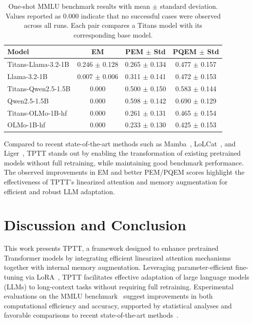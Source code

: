 \documentclass[10pt,a4paper]{article}
\begin{document}
\begin{table}[h!]
    \centering
    \renewcommand{\arraystretch}{1.2}
    \begin{tabular}{|l|c|c|c|}
    \hline
    Model & EM & PEM $\pm$ Std & PQEM $\pm$ Std \\
    \hline
    Titans-Llama-3.2-1B & 0.246 $\pm$ 0.128 & 0.265 $\pm$ 0.134 & 0.477 $\pm$ 0.157 \\
    Llama-3.2-1B        & 0.007 $\pm$ 0.006 & 0.311 $\pm$ 0.141 & 0.472 $\pm$ 0.153 \\
    \hline
    Titans-Qwen2.5-1.5B & 0.000              & 0.500 $\pm$ 0.150 & 0.583 $\pm$ 0.144 \\
    Qwen2.5-1.5B        & 0.000              & 0.598 $\pm$ 0.142 & 0.690 $\pm$ 0.129 \\
    \hline
    Titans-OLMo-1B-hf   & 0.000              & 0.261 $\pm$ 0.131 & 0.465 $\pm$ 0.154 \\
    OLMo-1B-hf          & 0.000              & 0.233 $\pm$ 0.130 & 0.425 $\pm$ 0.153 \\
    \hline
    \end{tabular}
    \caption{One-shot MMLU benchmark results with mean $\pm$ standard deviation. 
    Values reported as 0.000 indicate that no successful cases were observed across all runs. 
    Each pair compares a Titans model with its corresponding base model.}
    \label{tab:mmlu-results}
\end{table}


Compared to recent state-of-the-art methods such as Mamba~\cite{gu2023mamba}, LoLCat~\cite{zhang2024lolcats}, and Liger~\cite{lan2025liger}, TPTT stands out by enabling the transformation of existing pretrained models without full retraining, while maintaining good benchmark performance. The observed improvements in EM and better PEM/PQEM scores highlight the effectiveness of TPTT's linearized attention and memory augmentation for efficient and robust LLM adaptation.

\section{Discussion and Conclusion}

This work presents TPTT, a framework designed to enhance pretrained Transformer models by integrating efficient linearized attention mechanisms together with internal memory augmentation. Leveraging parameter-efficient fine-tuning via LoRA~\cite{hu2022lora}, TPTT facilitates effective adaptation of large language models (LLMs) to long-context tasks without requiring full retraining. Experimental evaluations on the MMLU benchmark~\cite{hendrycks2020measuring} suggest improvements in both computational efficiency and accuracy, supported by statistical analyses and favorable comparisons to recent state-of-the-art methods~\cite{gu2023mamba, zhang2024lolcats, lan2025liger}.
\end{document}
